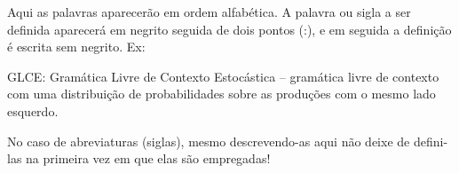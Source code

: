 
Aqui as palavras aparecerão em ordem alfabética. A palavra ou sigla a ser definida aparecerá em negrito seguida de dois pontos (:), e em seguida a definição é escrita sem negrito. Ex:

GLCE: Gramática Livre de Contexto Estocástica – gramática livre de contexto com uma distribuição de probabilidades sobre as produções com o mesmo lado esquerdo.

No caso de abreviaturas (siglas), mesmo descrevendo-as aqui não deixe de defini-las na primeira vez em que elas são empregadas!

\cleardoublepage